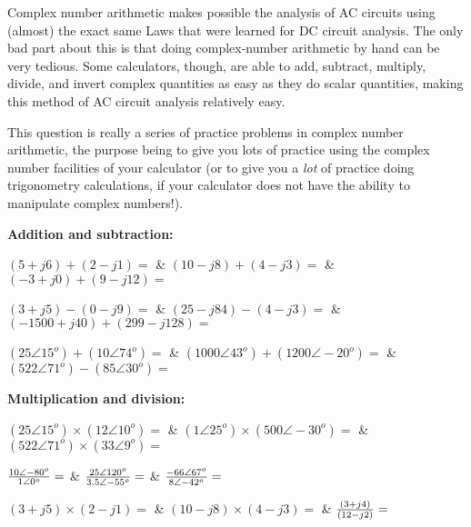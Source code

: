 

Complex number arithmetic makes possible the analysis of AC circuits using (almost) the exact same Laws that were learned for DC circuit analysis.  The only bad part about this is that doing complex-number arithmetic by hand can be very tedious.  Some calculators, though, are able to add, subtract, multiply, divide, and invert complex quantities as easy as they do scalar quantities, making this method of AC circuit analysis relatively easy.

This question is really a series of practice problems in complex number arithmetic, the purpose being to give you lots of practice using the complex number facilities of your calculator (or to give you a {\it lot} of practice doing trigonometry calculations, if your calculator does not have the ability to manipulate complex numbers!).  

\vskip 10pt

\noindent
{\bf Addition and subtraction:}

\vskip 5pt

 \columns
\+ $(5 + j6) + (2 - j1) =$  &
$(10 - j8) + (4 - j3) =$  &
$(-3 + j0) + (9 - j12) =$ \cr

\vskip 20pt

\+ $(3 + j5) - (0 - j9) =$  &
$(25 - j84) - (4 - j3) =$  &  
$(-1500 + j40) + (299 - j128) =$ \cr

\vskip 20pt

\+ $(25 \angle 15^o) + (10 \angle 74^o) =$  &
$(1000 \angle 43^o) + (1200 \angle -20^o) =$  &  
$(522 \angle 71^o) - (85 \angle 30^o) =$  \cr

\vskip 20pt

\noindent
{\bf Multiplication and division:}

\vskip 5pt

 \columns
\+ $(25 \angle 15^o) \times (12 \angle 10^o) =$  &
$(1 \angle 25^o) \times (500 \angle -30^o) =$  &  
$(522 \angle 71^o) \times (33 \angle 9^o) =$  \cr

\vskip 20pt

\+ ${{10 \angle -80^o} \over {1 \angle 0^o}} =$  &
${{25 \angle 120^o} \over {3.5 \angle -55^o}} =$  &  
${{-66 \angle 67^o} \over {8 \angle -42^o}} =$ \cr

\vskip 20pt

\+ $(3 + j5) \times (2 - j1) =$  &  
$(10 - j8) \times (4 - j3) =$  &  
${(3 + j4) \over (12 - j2)} =$ \cr

